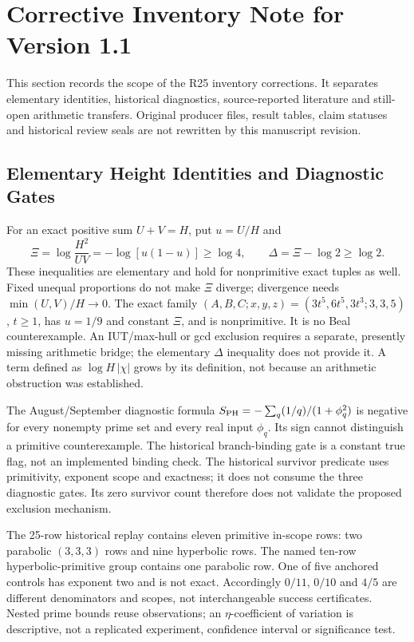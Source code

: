 \documentclass[11pt,a4paper]{article}
\begin{document}
\section{Corrective Inventory Note for Version 1.1}
\label{sec:inventory-corrections}

This section records the scope of the R25 inventory corrections.
It separates elementary identities, historical diagnostics,
source-reported literature and still-open arithmetic transfers.
Original producer files, result tables, claim statuses and historical
review seals are not rewritten by this manuscript revision.

\subsection{Elementary Height Identities and Diagnostic Gates}
For an exact positive sum $U+V=H$, put $u=U/H$ and
\[
 \Xi=\log\frac{H^2}{UV}=-\log[u(1-u)]\ge\log4,\qquad
 \Delta=\Xi-\log2\ge\log2.
\]
These inequalities are elementary and hold for nonprimitive exact
tuples as well. Fixed unequal proportions do not make $\Xi$ diverge;
divergence needs $\min(U,V)/H\to0$.
The exact family $(A,B,C;x,y,z)=(3t^5,6t^5,3t^3;3,3,5)$,
$t\ge1$, has $u=1/9$ and constant $\Xi$, and is nonprimitive.
It is no Beal counterexample.
An IUT/max-hull or gcd exclusion requires a separate, presently
missing arithmetic bridge; the elementary $\Delta$ inequality does
not provide it. A term defined as $\log H\,|\chi|$ grows by its
definition, not because an arithmetic obstruction was established.

The August/September diagnostic formula
$S_{\rm PH}=-\sum_q (1/q)/(1+\phi_q^2)$ is negative for every
nonempty prime set and every real input $\phi_q$.
Its sign cannot distinguish a primitive counterexample.
The historical branch-binding gate is a constant true flag, not
an implemented binding check. The historical survivor predicate
uses primitivity, exponent scope and exactness; it does not consume
the three diagnostic gates. Its zero survivor count therefore
does not validate the proposed exclusion mechanism.

The 25-row historical replay contains eleven primitive
in-scope rows: two parabolic $(3,3,3)$ rows and nine hyperbolic
rows. The named ten-row hyperbolic-primitive group contains one
parabolic row. One of five anchored controls has exponent two
and is not exact. Accordingly $0/11$, $0/10$ and $4/5$ are
different denominators and scopes, not interchangeable success
certificates. Nested prime bounds reuse observations; an
$\eta$-coefficient of variation is descriptive, not a replicated
experiment, confidence interval or significance test.
\end{document}
